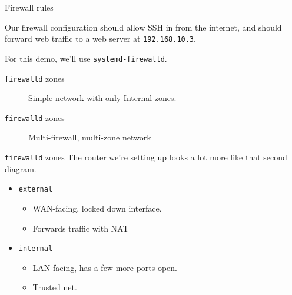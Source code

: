 \documentclass[bigger,aspectratio=169]{beamer}
\begin{document}
\begin{frame}{Firewall rules}

  Our firewall configuration should allow SSH in from the internet, and should
  forward web traffic to a web server at \texttt{192.168.10.3}.

  For this demo, we'll use \texttt{systemd-firewalld}.
\end{frame}

\begin{frame}{\texttt{firewalld} zones}
  \begin{figure}
    
    \caption{Simple network with only Internal zones.}
  \end{figure}
\end{frame}

\begin{frame}{\texttt{firewalld} zones}
  \begin{figure}
    
    \caption{Multi-firewall, multi-zone network}
  \end{figure}
\end{frame}

\begin{frame}{\texttt{firewalld} zones}
  The router we're setting up looks a lot more like that second diagram.

  \begin{itemize}
  \item \texttt{external}
    \begin{itemize}
    \item WAN-facing, locked down interface.
    \item Forwards traffic with NAT
    \end{itemize}
  \item \texttt{internal}
    \begin{itemize}
    \item LAN-facing, has a few more ports open.
    \item Trusted net.
    \end{itemize}
  \end{itemize}
\end{frame}
\end{document}
